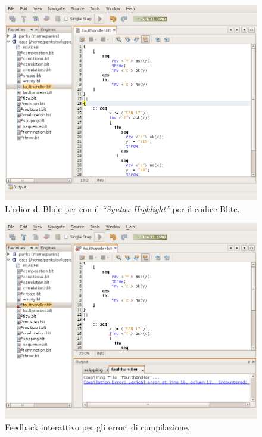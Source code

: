 \begin{figure}[t]
\begin{center}
\includegraphics[scale=0.60]
{blide/dia/BlideEditor}
\caption[Blide, l'editor per Blite]{L'edior di Blide per con il \emph{``Syntax
Highlight''} per il codice Blite.}
  \label{fig:blideEditor}
\end{center}
\end{figure}

\begin{figure}[b!]
\begin{center}
\includegraphics[scale=0.60]
{blide/dia/BlideCompError}
\caption[Blide, feedback alla compilazione]{Feedback interattivo per gli errori
di compilazione.}
  \label{fig:blideCompError}
\end{center}
\end{figure}

